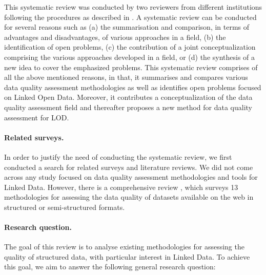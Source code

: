 This systematic review was conducted by two reviewers from different institutions following the procedures as described in \cite{kitchenham:2004, Moher:2009}. 
A systematic review can be conducted for several reasons such as (a) the summarisation and comparison, in terms of advantages and disadvantages, of various approaches in a field, (b) the identification of open problems, (c) the contribution of a joint conceptualization comprising the various approaches developed in a field, or (d) the synthesis of a new idea to cover the emphasized problems. 
This systematic review comprises of all the above mentioned reasons, in that, it summarises and compares various data quality assessment methodologies as well as identifies open problems focused on Linked Open Data.
Moreover, it contributes a conceptualization of the data quality assessment field and thereafter proposes a new method for data quality assessment for LOD.

\paragraph{Related surveys.}
In order to justify the need of conducting the systematic review, we first conducted a search for related surveys and literature reviews.
We did not come across any study focused on data quality assessment methodologies and tools for Linked Data. 
However, there is a comprehensive review \cite{Batini:2006}, which surveys 13 methodologies for assessing the data quality of datasets available on the web in structured or semi-structured formats.

\paragraph{Research question.}
The goal of this review is to analyse existing methodologies for assessing the quality of structured data, with particular interest in Linked Data.
To achieve this goal, we aim to answer the following general research question: \\


